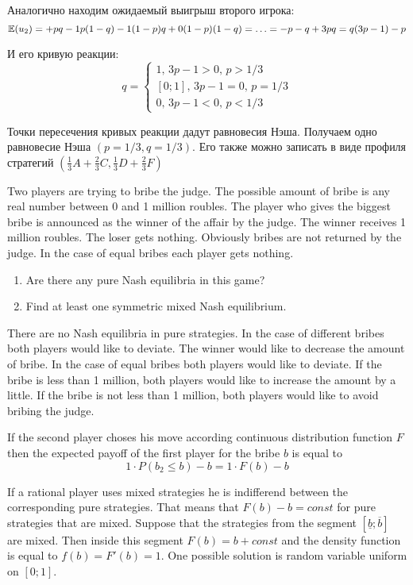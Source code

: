 \begin{solution}
Аналогично находим ожидаемый выигрыш второго игрока:
\[
\mathbb{E}(u_2)=+pq-1p(1-q)-1(1-p)q+0(1-p)(1-q)=\ldots=-p-q+3pq=q(3p-1)-p
\]

И его кривую реакции:
\[
q=
\begin{cases}
1, \, 3p-1>0, \, p>1/3 \\
[0;1], \, 3p-1=0, \, p=1/3 \\
0, \, 3p-1<0, \, p<1/3
\end{cases}
\]

Точки пересечения кривых реакции дадут равновесия Нэша. Получаем одно равновесие Нэша $(p=1/3,q=1/3)$. Его также можно записать в виде профиля стратегий $(\frac{1}{3}A+\frac{2}{3}C,\frac{1}{3}D+\frac{2}{3}F)$


\end{solution}

\begin{problem}
Two players are trying to bribe the judge. The possible amount of bribe is any real number between 0 and 1 million roubles. The player who gives the biggest bribe is announced as the winner of the affair by the judge. The winner receives 1 million roubles. The loser gets nothing. Obviously bribes are not returned by the judge. In the case of equal bribes each player gets nothing.
\begin{enumerate}
\item Are there any pure Nash equilibria in this game?
\item Find at least one symmetric mixed Nash equilibrium.
\end{enumerate}
\end{problem}

\begin{solution}

There are no Nash equilibria in pure strategies. In the case of different bribes both players would like to deviate. The winner would like to decrease the amount of bribe.  In the case of equal bribes both players would like to deviate. If the bribe is less than 1 million, both players would like to increase the amount by a little. If the bribe is not less than 1 million, both players would like to avoid bribing the judge.
 

If the second player choses his move according continuous distribution function $F$ then the expected payoff of the first player for the bribe $b$ is equal to
\[
1\cdot P(b_2 \leq b) - b = 1\cdot F(b)-b
\]

If a rational player uses mixed strategies he is indifferend between the corresponding pure strategies. That means that $F(b)-b=const$ for pure strategies that are mixed. Suppose that the strategies from the segment $[\underline{b};\overline{b}]$ are mixed. Then inside this segment $F(b)=b+const$ and the density function is equal to $f(b)=F'(b)=1$. One possible solution is random variable uniform on $[0;1]$.
\end{solution}

